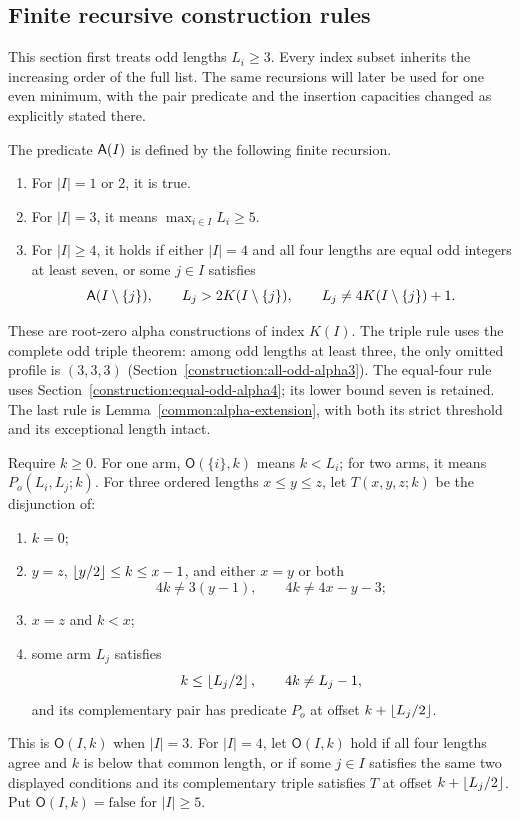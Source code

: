 \subsection{Finite recursive construction rules}\label{eight:recursions}

This section first treats odd lengths $L_i\ge3$.  Every index subset
inherits the increasing order of the full list.  The same recursions
will later be used for one even minimum, with the pair predicate and
the insertion capacities changed as explicitly stated there.

\begin{definition}\label{eight:alpha-rule}
The predicate $\mathsf A(I)$ is defined by the following finite recursion.
\begin{enumerate}
\item For $|I|=1$ or $2$, it is true.
\item For $|I|=3$, it means $\max_{i\in I}L_i\ge5$.
\item For $|I|\ge4$, it holds if either $|I|=4$ and all four lengths
  are equal odd integers at least seven, or some $j\in I$ satisfies
  \[
   \mathsf A(I\setminus\{j\}),\qquad
   L_j>2K(I\setminus\{j\}),\qquad
   L_j\ne4K(I\setminus\{j\})+1.
  \]
\end{enumerate}
\end{definition}

These are root-zero alpha constructions of index $K(I)$.  The triple
rule uses the complete odd triple theorem: among odd lengths at least
three, the only omitted profile is $(3,3,3)$
(Section~\ref{construction:all-odd-alpha3}).  The equal-four rule uses
Section~\ref{construction:equal-odd-alpha4}; its lower bound seven is
retained.  The last rule is Lemma~\ref{common:alpha-extension}, with
both its strict threshold and its exceptional length intact.

\begin{definition}\label{eight:offset-rule}
Require $k\ge0$.  For one arm, $\mathsf O(\{i\},k)$ means $k<L_i$;
for two arms, it means $P_o(L_i,L_j;k)$.  For three ordered lengths
$x\le y\le z$, let $T(x,y,z;k)$ be the disjunction of:
\begin{enumerate}
\item $k=0$;
\item $y=z$, $\left\lfloor y/2\right\rfloor\le k\le x-1$, and either $x=y$ or both
  \[
   4k\ne3(y-1),\qquad 4k\ne4x-y-3;
  \]
\item $x=z$ and $k<x$;
\item some arm $L_j$ satisfies
  \[
   k\le\left\lfloor L_j/2\right\rfloor,\qquad4k\ne L_j-1,
  \]
  and its complementary pair has predicate $P_o$ at offset
  $k+\left\lfloor L_j/2\right\rfloor$.
\end{enumerate}
This is $\mathsf O(I,k)$ when $|I|=3$.  For $|I|=4$, let
$\mathsf O(I,k)$ hold if all four lengths agree and $k$ is below that
common length, or if some $j\in I$ satisfies the same two displayed
conditions and its complementary triple satisfies $T$ at offset
$k+\left\lfloor L_j/2\right\rfloor$.  Put $\mathsf O(I,k)=\mathrm{false}$ for $|I|\ge5$.
\end{definition}

